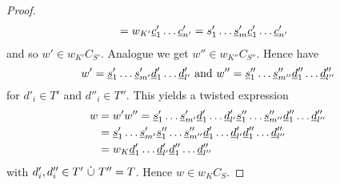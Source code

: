 \begin{theo}
\begin{proof}
\begin{align*}
				& = w_{K'} \underline{c}'_1 \ldots \underline{c}'_{n'} = s'_1 \ldots \underline{s}'_m \underline{c}'_1 \ldots \underline{c}'_{n'}
		\end{align*}
		and so $w' \in w_{K'}C_{S'}$. Analogue we get $w'' \in w_{K''}C_{S''}$. Hence have
		$$ w' = \underline{s}'_1 \ldots \underline{s}'_{m'} \underline{d}'_1 \ldots \underline{d}'_{l'} \textrm{ and } w'' = \underline{s}''_1 \ldots \underline{s}''_{m''} \underline{d}''_1 \ldots \underline{d}''_{l''} $$
		for $d'_i \in T'$ and $d''_i \in T''$. This yields a twisted expression
		\begin{align*}
			w	& = w' w'' = \underline{s}'_1 \ldots \underline{s}'_{m'} \underline{d}'_1 \ldots \underline{d}'_{l'} \underline{s}''_1 \ldots \underline{s}''_{m''} \underline{d}''_1 \ldots \underline{d}''_{l''} \\
				& = \underline{s}'_1 \ldots \underline{s}'_{m'} \underline{s}''_1 \ldots \underline{s}''_{m''} \underline{d}'_1 \ldots \underline{d}'_{l'} \underline{d}''_1 \ldots \underline{d}''_{l''} \\
				& = w_K \underline{d}'_1 \ldots \underline{d}'_{l'} \underline{d}''_1 \ldots \underline{d}''_{l''}
		\end{align*}
		with $d'_i,d''_i \in T' \ \dot \cup \  T'' = T$. Hence $w \in w_KC_S$.
	\end{proof}
\end{theo}